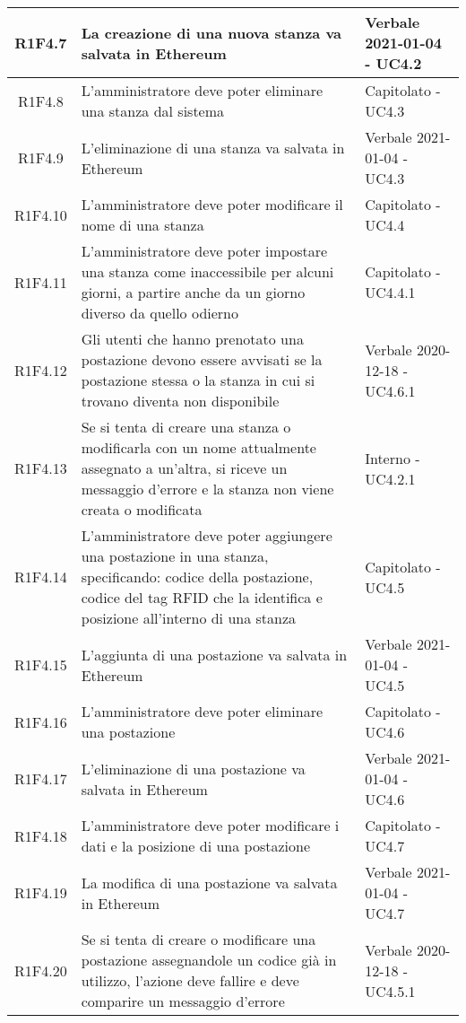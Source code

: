 \begin{center}
\begin{longtable}{|c|p{10cm}|p{4cm}|}
						\hline
				R1F4.7&	La creazione di una nuova stanza va salvata in Ethereum&Verbale 2021-01-04 - UC4.2 	\\
						\hline
				R1F4.8&L'amministratore deve poter eliminare una stanza dal sistema	& Capitolato - UC4.3	\\
						\hline
				R1F4.9&L'eliminazione di una stanza va salvata in Ethereum	& Verbale 2021-01-04 - UC4.3	\\
						\hline
				R1F4.10&L'amministratore deve poter modificare il nome di una stanza	& Capitolato - UC4.4	\\
						\hline
			R1F4.11&L'amministratore deve poter impostare una stanza come inaccessibile per alcuni giorni, a partire anche da un giorno diverso da quello odierno	& Capitolato - UC4.4.1	\\
					\hline
			R1F4.12&Gli utenti che hanno prenotato una postazione devono essere avvisati se la postazione stessa o la stanza in cui si trovano diventa non disponibile	& Verbale 2020-12-18 - UC4.6.1	\\
					\hline
R1F4.13&Se si tenta di creare una stanza o modificarla con un nome attualmente assegnato a un'altra, si riceve un messaggio d'errore e la stanza non viene creata o modificata	& Interno - UC4.2.1	\\
						\hline
			R1F4.14&L'amministratore deve poter aggiungere una postazione in una stanza, specificando: codice della postazione, codice del tag RFID che la identifica e posizione all'interno di una stanza	& Capitolato - UC4.5	\\
					\hline
			R1F4.15&L'aggiunta di una postazione va salvata in Ethereum	&Verbale 2021-01-04 - UC4.5 	\\
					\hline
R1F4.16&L'amministratore deve poter eliminare una postazione	& Capitolato - UC4.6	\\
						\hline
		R1F4.17	&L'eliminazione di una postazione va salvata in Ethereum	& Verbale 2021-01-04 - UC4.6	\\
					\hline
			R1F4.18&L'amministratore deve poter modificare i dati e la posizione di una postazione	& Capitolato - UC4.7	\\
					\hline
R1F4.19&	La modifica di una postazione va salvata in Ethereum& Verbale 2021-01-04 - UC4.7	\\
					\hline
R1F4.20&	Se si tenta di creare o modificare una postazione assegnandole un codice già in utilizzo, l'azione deve fallire e deve comparire un messaggio d'errore& Verbale 2020-12-18 - UC4.5.1 	\\
						\hline

\end{longtable}
\end{center}

